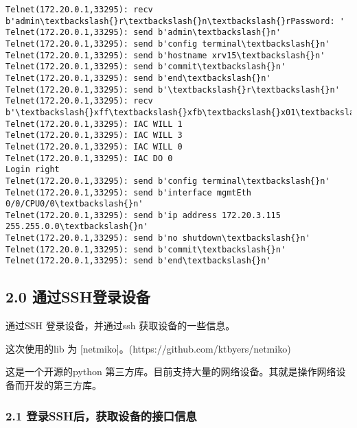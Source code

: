\documentclass[11pt]{article}
\begin{document}
\begin{Verbatim}[commandchars=\\\{\}]
Telnet(172.20.0.1,33295): recv b'admin\textbackslash{}r\textbackslash{}n\textbackslash{}rPassword: '
Telnet(172.20.0.1,33295): send b'admin\textbackslash{}n'
Telnet(172.20.0.1,33295): send b'config terminal\textbackslash{}n'
Telnet(172.20.0.1,33295): send b'hostname xrv15\textbackslash{}n'
Telnet(172.20.0.1,33295): send b'commit\textbackslash{}n'
Telnet(172.20.0.1,33295): send b'end\textbackslash{}n'
Telnet(172.20.0.1,33295): send b'\textbackslash{}r\textbackslash{}n'
Telnet(172.20.0.1,33295): recv b'\textbackslash{}xff\textbackslash{}xfb\textbackslash{}x01\textbackslash{}xff\textbackslash{}xfb\textbackslash{}x03\textbackslash{}xff\textbackslash{}xfb\textbackslash{}x00\textbackslash{}xff\textbackslash{}xfd\textbackslash{}x00\textbackslash{}x1b]0;xrv15\textbackslash{}x07\textbackslash{}r\textbackslash{}n\textbackslash{}rRP/0/0/CPU0:xrv15\#\textbackslash{}r\textbackslash{}n\textbackslash{}rRP/0'
Telnet(172.20.0.1,33295): IAC WILL 1
Telnet(172.20.0.1,33295): IAC WILL 3
Telnet(172.20.0.1,33295): IAC WILL 0
Telnet(172.20.0.1,33295): IAC DO 0
Login right
Telnet(172.20.0.1,33295): send b'config terminal\textbackslash{}n'
Telnet(172.20.0.1,33295): send b'interface mgmtEth 0/0/CPU0/0\textbackslash{}n'
Telnet(172.20.0.1,33295): send b'ip address 172.20.3.115 255.255.0.0\textbackslash{}n'
Telnet(172.20.0.1,33295): send b'no shutdown\textbackslash{}n'
Telnet(172.20.0.1,33295): send b'commit\textbackslash{}n'
Telnet(172.20.0.1,33295): send b'end\textbackslash{}n'

    \end{Verbatim}

    \hypertarget{ux901aux8fc7sshux767bux5f55ux8bbeux5907}{%
\subsection{2.0
通过SSH登录设备}\label{ux901aux8fc7sshux767bux5f55ux8bbeux5907}}

通过SSH 登录设备，并通过ssh 获取设备的一些信息。

这次使用的lib 为 {[}netmiko{]}。(https://github.com/ktbyers/netmiko)

这是一个开源的python
第三方库。目前支持大量的网络设备。其就是操作网络设备而开发的第三方库。

    \hypertarget{ux767bux5f55sshux540eux83b7ux53d6ux8bbeux5907ux7684ux63a5ux53e3ux4fe1ux606f}{%
\subsubsection{2.1
登录SSH后，获取设备的接口信息}\label{ux767bux5f55sshux540eux83b7ux53d6ux8bbeux5907ux7684ux63a5ux53e3ux4fe1ux606f}}
\end{document}
